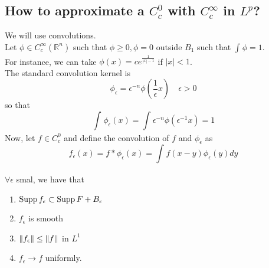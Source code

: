 \documentclass[../main.tex]{subfiles}
\begin{document}
\subsection{How to approximate a $C^{0}_c$ with $C^{ \infty }_c$ in $L^{p}$? }
We will use convolutions.\\
Let $\phi \in C^{ \infty }_c ( \mathbb{R}^n) $ such that $\phi \geq 0, \phi=0$ outside $B_1$ such that $ \int_{  }^{  } \phi =1$.\\
For instance, we can take $ \phi( x) = c e^{ \frac{1}{|x| -1}} $ if $|x| <1$.\\
The standard convolution kernel is
\[ 
\phi_\epsilon  = \epsilon^{-n} \phi(  \frac{1}{\epsilon} x) \quad \epsilon >0
\]
so that
\[ 
\int_{  }^{  } \phi_\epsilon ( x)  = \int_{  }^{  } \epsilon^{-n}\phi( \epsilon^{-1} x ) = 1
\]
Now, let $f\in C^{0}_c$ and define the convolution of $f$ and $\phi_\epsilon$ as
\[ 
f_\epsilon( x) = f \ast \phi_\epsilon ( x) = \int_{  }^{  } f( x-y) \phi_\epsilon( y) dy
\]
\begin{lemma}
$\forall \epsilon $ smal, we have that
\begin{enumerate}
\item $\operatorname{Supp} f_\epsilon \subset \operatorname{Supp} F + B_\epsilon$ 
\item $f_\epsilon$ is smooth
\item $\left\lVert f_\epsilon\right\rVert  \leq  \left\lVert f\right\rVert $ in $ L^{1}$ 
\item $f_\epsilon\to f$ uniformly.
\end{enumerate}

\end{lemma}
\end{document}
